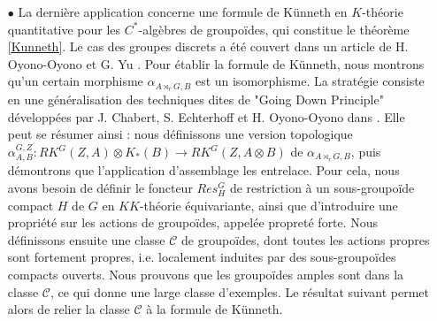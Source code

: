 \begin{itemize}
\item[$\bullet$] La dernière application concerne une formule de Künneth en $K$-théorie quantitative pour les $C^*$-algèbres de groupoïdes, qui constitue le théorème \ref{Kunneth}. Le cas des groupes discrets a été couvert dans un article de H. Oyono-Oyono et G. Yu \cite{OY4}. Pour établir la formule de Künneth, nous montrons qu'un certain morphisme $\alpha_{A\rtimes_r G,B}$ est un isomorphisme. La stratégie consiste en une généralisation des techniques dites de "Going Down Principle" développées par J. Chabert, S. Echterhoff et H. Oyono-Oyono dans \cite{ChabertEOY}. Elle peut se résumer ainsi : nous définissons une version topologique $\alpha_{A,B}^{G,Z} : RK^G(Z,A)\otimes K_*(B)\rightarrow RK^G(Z,A\otimes B )$ de $\alpha_{A\rtimes_r G,B}$, puis démontrons que l'application d'assemblage les entrelace. Pour cela, nous avons besoin de définir le foncteur $Res_H^G$ de restriction à un sous-groupoïde compact $H$ de $G$ en $KK$-théorie équivariante, ainsi que d'introduire une propriété sur les actions de groupoïdes, appelée propreté forte. Nous définissons ensuite une classe $\mathcal C$ de groupoïdes, dont toutes les actions propres sont fortement propres, i.e. localement induites par des sous-groupoïdes compacts ouverts. Nous prouvons que les groupoïdes amples sont dans la classe $\mathcal C$, ce qui donne une large classe d'exemples. Le résultat suivant permet alors de relier la classe $\mathcal C$ à la formule de Künneth. \\



\end{itemize}
